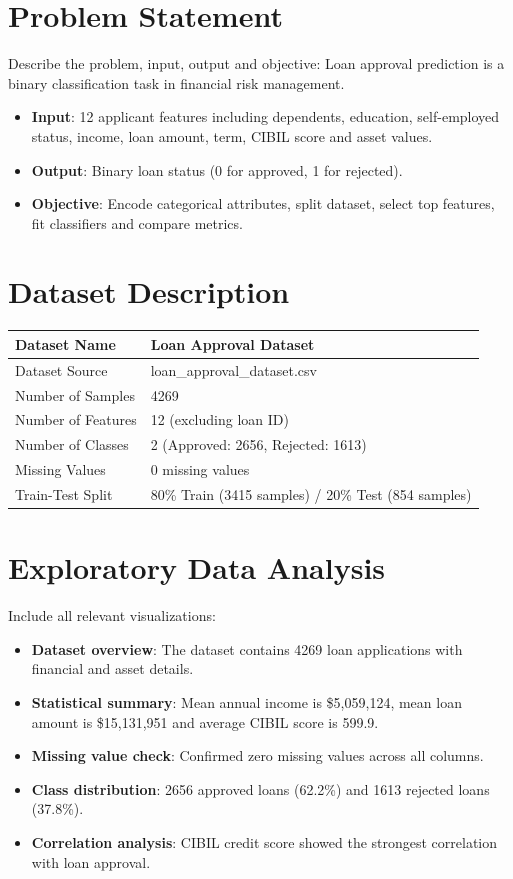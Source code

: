 \documentclass[12pt,a4paper]{article}
\begin{document}
\section{Problem Statement}
Describe the problem, input, output and objective:
Loan approval prediction is a binary classification task in financial risk management.
\begin{itemize}
\item \textbf{Input}: 12 applicant features including dependents, education, self-employed status, income, loan amount, term, CIBIL score and asset values.
\item \textbf{Output}: Binary loan status (0 for approved, 1 for rejected).
\item \textbf{Objective}: Encode categorical attributes, split dataset, select top features, fit classifiers and compare metrics.
\end{itemize}

\section{Dataset Description}
\begin{longtable}{|p{6cm}|p{8cm}|}
\hline
Dataset Name & Loan Approval Dataset \\ \hline
Dataset Source & loan\_approval\_dataset.csv \\ \hline
Number of Samples & 4269 \\ \hline
Number of Features & 12 (excluding loan ID) \\ \hline
Number of Classes & 2 (Approved: 2656, Rejected: 1613) \\ \hline
Missing Values & 0 missing values \\ \hline
Train-Test Split & 80\% Train (3415 samples) / 20\% Test (854 samples) \\ \hline
\end{longtable}

\section{Exploratory Data Analysis}
Include all relevant visualizations:
\begin{itemize}
\item \textbf{Dataset overview}: The dataset contains 4269 loan applications with financial and asset details.
\item \textbf{Statistical summary}: Mean annual income is \$5,059,124, mean loan amount is \$15,131,951 and average CIBIL score is 599.9.
\item \textbf{Missing value check}: Confirmed zero missing values across all columns.
\item \textbf{Class distribution}: 2656 approved loans (62.2\%) and 1613 rejected loans (37.8\%).
\item \textbf{Correlation analysis}: CIBIL credit score showed the strongest correlation with loan approval.
\end{itemize}
\end{document}

